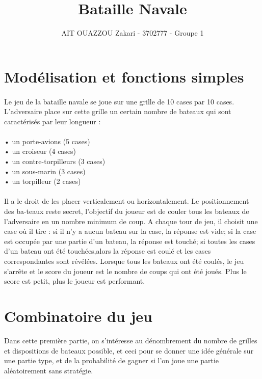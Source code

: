 \documentclass[12pt]{article}
\begin{document}
 
 
\title{Bataille Navale}%
\author{AIT OUAZZOU Zakari - 3702777 - Groupe 1} %
 
\maketitle

\section{Modélisation et fonctions simples}
    \paragraph{}
    Le jeu de la bataille navale se joue sur une grille de 10 cases par 10 cases. L’adversaire place sur cette grille un certain nombre de bateaux qui sont caractérisés par leur longueur :\\\\
    • un porte-avions (5 cases)\\
    • un croiseur (4 cases)\\
    • un contre-torpilleurs (3 cases)\\
    • un sous-marin (3 cases)\\
    • un torpilleur (2 cases)\\\\
    Il a le droit de les placer verticalement ou horizontalement. Le positionnement des ba-teaux reste secret, l’objectif du joueur est de couler tous les bateaux de l’adversaire en un nombre minimum de coup. A chaque tour de jeu, il choisit une case où il tire : si il n’y a aucun bateau sur la case, la réponse est vide; si la case est occupée par une partie d’un bateau, la réponse est touché; si toutes les cases d’un bateau ont été touchées,alors la réponse est coulé et les cases correspondantes sont révélées. Lorsque tous les bateaux ont été coulés, le jeu s’arrête et le score du joueur est le nombre de coups qui ont été joués. Plus le score est petit, plus le joueur est performant.
\section{Combinatoire du jeu}
    Dans cette première partie, on s'intéresse au dénombrement du nombre de grilles et dispositions de bateaux possible, et ceci pour se donner une idée générale sur une partie type, et de la probabilité de gagner si l'on joue une partie aléatoirement sans stratégie.
\end{document}
